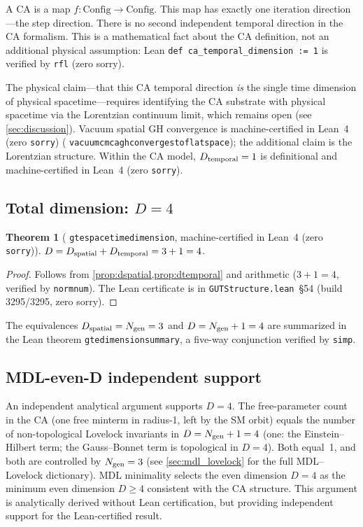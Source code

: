 \documentclass[11pt]{article}
\newtheorem{theorem}{Theorem}[section]
\theoremstyle{remark}
\newcommand{\lean}[1]{%
  \penalty-100
  \begingroup\def\_{\textunderscore\allowbreak}\texttt{#1}\endgroup}
\newcommand{\CatAL}{machine-certified in Lean~4 (zero \texttt{sorry})}
\newcommand{\Ngen}{N_{\rm gen}}
\begin{document}
A CA is a map $f: \mathrm{Config} \to \mathrm{Config}$.
This map has exactly one iteration direction---the step direction.
There is no second independent temporal direction in the CA formalism.
This is a mathematical fact about the CA definition, not an additional
physical assumption: Lean \texttt{def ca\_temporal\_dimension := 1} is
verified by \texttt{rfl} (zero sorry).

The physical claim---that this CA temporal direction \emph{is} the single
time dimension of physical spacetime---requires identifying the CA substrate
with physical spacetime via the Lorentzian continuum limit, which remains open
(see \cref{sec:discussion}). Vacuum spatial GH convergence is \CatAL{}
(\lean{vacuum\_cmca\_gh\_converges\_to\_flat\_space}); the additional claim is the
Lorentzian structure.
Within the CA model, $D_{\rm temporal} = 1$ is definitional and \CatAL{}.

\subsection{Total dimension: \texorpdfstring{$D = 4$}{D=4}}
\label{ssec:total_dim}

\begin{theorem}[\lean{gte\_spacetime\_dimension}, \CatAL]
\label{thm:d4}
$D = D_{\rm spatial} + D_{\rm temporal} = 3 + 1 = 4$.
\end{theorem}

\begin{proof}
Follows from \cref{prop:dspatial,prop:dtemporal} and arithmetic
($3 + 1 = 4$, verified by \lean{norm\_num}).
The Lean certificate is in \lean{GUTStructure.lean}~\S54
(build 3295/3295, zero sorry).
\end{proof}

The equivalences $D_{\rm spatial} = \Ngen = 3$ and $D = \Ngen + 1 = 4$ are
summarized in the Lean theorem \lean{gte\_dimension\_summary}, a five-way
conjunction verified by \texttt{simp}.

\subsection{MDL-even-D independent support}
\label{ssec:mdl_even}

An independent analytical argument supports $D = 4$.
The free-parameter count in the CA (one free minterm in radius-1, left by
the SM orbit) equals the number of non-topological Lovelock invariants in
$D = \Ngen + 1 = 4$ (one: the Einstein--Hilbert term; the Gauss--Bonnet
term is topological in $D = 4$).
Both equal~1, and both are controlled by $\Ngen = 3$ (see
\cref{sec:mdl_lovelock} for the full MDL--Lovelock dictionary).
MDL minimality selects the even dimension $D = 4$ as the minimum even
dimension $D \geq 4$ consistent with the CA structure.
This argument is analytically derived without Lean certification,
but providing independent support for the Lean-certified result.
\end{document}
